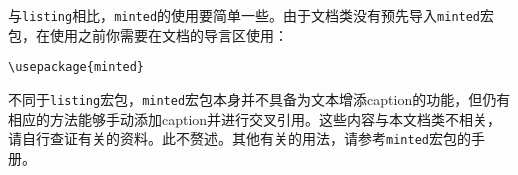 与\texttt{listing}相比，\texttt{minted}的使用要简单一些。由于文档类没有预先导入\texttt{minted}宏包，在使用之前你需要在文档的导言区使用：

\begin{verbatim}
\usepackage{minted}
\end{verbatim}

不同于\texttt{listing}宏包，\texttt{minted}宏包本身并不具备为文本增添caption的功能，但仍有相应的方法能够手动添加caption并进行交叉引用。这些内容与本文档类不相关，请自行查证有关的资料。此不赘述。其他有关的用法，请参考\texttt{minted}宏包的手册。